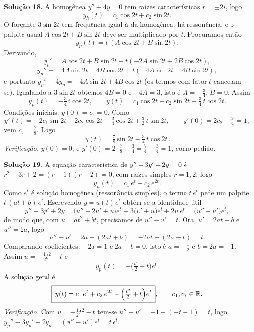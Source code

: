 \bigskip\noindent\textbf{Solução 18.}\quad
A homogênea $y''+4y=0$ tem raízes características $r=\pm 2i$, logo
\[
y_h(t)=c_1\cos 2t+c_2\sin 2t .
\]
O forçante $3\sin 2t$ tem frequência igual à da homogênea: há ressonância, e o palpite usual $A\cos2t+B\sin2t$ deve ser multiplicado por $t$. Procuramos então
\[
y_p(t)=t\,(A\cos 2t+B\sin 2t).
\]
Derivando,
\[
y_p'=A\cos2t+B\sin2t+t(-2A\sin2t+2B\cos2t),
\]
\[
y_p''=-4A\sin2t+4B\cos2t+t(-4A\cos2t-4B\sin2t),
\]
e portanto $y_p''+4y_p=-4A\sin2t+4B\cos2t$ (os termos com fator $t$ cancelam-se). Igualando a $3\sin2t$ obtemos $4B=0$ e $-4A=3$, isto é $A=-\tfrac34$, $B=0$. Assim
\[
y_p(t)=-\tfrac34\,t\cos 2t,
\qquad
y(t)=c_1\cos2t+c_2\sin2t-\tfrac34\,t\cos2t .
\]
Condições iniciais: $y(0)=c_1=0$. Como
\[
y'(t)=-2c_1\sin2t+2c_2\cos2t-\tfrac34\cos2t+\tfrac32\,t\sin2t,
\qquad y'(0)=2c_2-\tfrac34=1,
\]
vem $c_2=\tfrac{7}{8}$. Logo
\[
\boxed{\,y(t)=\tfrac{7}{8}\sin 2t-\tfrac{3}{4}\,t\cos 2t\,}.
\]
\emph{Verificação.} $y(0)=0$; e $y'(0)=2\cdot\tfrac78-\tfrac34=\tfrac74-\tfrac34=1$, como pedido.


\bigskip\noindent\textbf{Solução 19.}\quad
A equação característica de $y''-3y'+2y=0$ é $r^2-3r+2=(r-1)(r-2)=0$, com raízes simples $r=1,2$; logo
\[
y_h(t)=c_1\,e^t+c_2\,e^{2t}.
\]
Como $e^t$ é solução homogênea (ressonância simples), o termo $t\,e^t$ pede um palpite $t\,(at+b)\,e^t$. Escrevendo $y=u(t)\,e^t$ obtém-se a identidade útil
\[
y''-3y'+2y=\big(u''+2u'+u\big)e^t-3\big(u'+u\big)e^t+2u\,e^t=\big(u''-u'\big)e^t ,
\]
de modo que, com $u=at^2+bt$, precisamos de $u''-u'=t$. Ora, $u'=2at+b$ e $u''=2a$, logo
\[
u''-u'=2a-(2at+b)=-2at+(2a-b)=t .
\]
Comparando coeficientes: $-2a=1$ e $2a-b=0$, isto é $a=-\tfrac12$ e $b=2a=-1$. Assim $u=-\tfrac12 t^2-t$ e
\[
y_p(t)=-\Big(\tfrac{t^2}{2}+t\Big)e^t .
\]
A solução geral é
\[
\boxed{\,y(t)=c_1\,e^t+c_2\,e^{2t}-\Big(\tfrac{t^2}{2}+t\Big)e^t\,},
\qquad c_1,c_2\in\mathbb{R} .
\]
\emph{Verificação.} Com $u=-\tfrac12 t^2-t$ tem-se $u''-u'=-1-(-t-1)=t$, logo $y_p''-3y_p'+2y_p=(u''-u')e^t=t\,e^t$.


